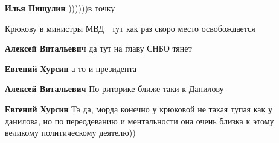 \begin{itemize}
\begin{itemize}
 
\textbf{Илья Пищулин} ))))))в точку
\end{itemize}

 
Крюкову в министры МВД🥳🥳 тут как раз скоро место освобождается

\begin{itemize}
 

\textbf{Алексей Витальевич} да тут на главу СНБО тянет

 
\textbf{Евгений Хурсин} а то и президента

 

\textbf{Алексей Витальевич} По риторике ближе таки к Данилову

 
\textbf{Евгений Хурсин} Та да, морда конечно у крюковой не такая тупая как у данилова, но по переодеванию и ментальности она очень близка к этому великому политическому деятелю))

 

\end{itemize}
\end{itemize}
